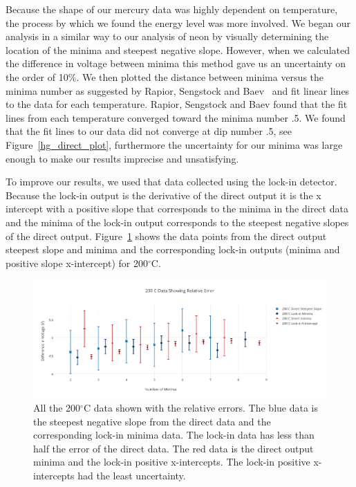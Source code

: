 \documentclass[prb,preprint]{revtex4-1}
\begin{document}
Because the shape of our mercury data was highly dependent on temperature, the process by which we found the energy level was more involved. We began our analysis in a similar way to our analysis of neon by visually determining the location of the minima and steepest negative slope. However, when we calculated the difference in voltage between minima this method gave us an uncertainty on the order of 10$\%$. We then plotted the distance between minima versus the minima number as suggested by Rapior, Sengstock and Baev~\cite{newfeatures} and fit linear lines to the data for each temperature. Rapior, Sengstock and Baev found that the fit lines from each temperature converged toward the minima number .5. We found that the fit lines to our data did not converge at dip number .5, see Figure~\ref{hg_direct_plot}, furthermore the uncertainty for our minima was large enough to make our results imprecise and unsatisfying.

To improve our results, we used that data collected using the lock-in detector. Because the lock-in output is the derivative of the direct output it is the x intercept with a positive slope that corresponds to the minima in the direct data and the minima of the lock-in output corresponds to the steepest negative slopes of the direct output. Figure~\ref{rel_error} shows the data points from the direct output steepest slope and minima and the corresponding lock-in outputs (minima and positive slope x-intercept) for 200$^{\circ}$C.

\begin{figure}[h!]
\centering

\includegraphics[width=6in]{rel_error.pdf}
\caption{All the 200$^{\circ}$C data shown with the relative errors. The blue data is the steepest negative slope from the direct data and the corresponding lock-in minima data. The lock-in data has less than half the error of the direct data. The red data is the direct output minima and the lock-in positive x-intercepts. The lock-in positive x-intercepts had the least uncertainty.}

\label{rel_error}
\end{figure}
\end{document}
